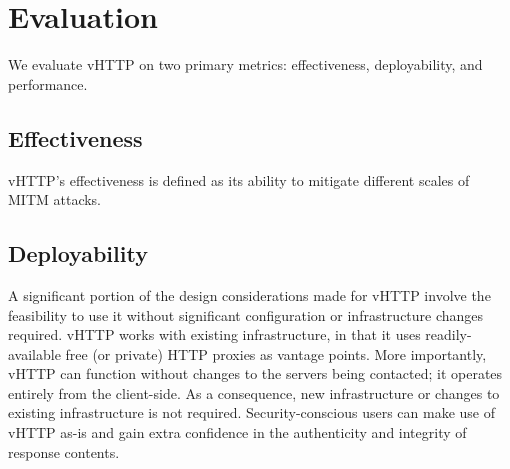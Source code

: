 \section{Evaluation}
\label{sec:eval}

We evaluate vHTTP on two primary metrics: effectiveness, deployability, and
performance.

\subsection{Effectiveness}

vHTTP's effectiveness is defined as its ability to mitigate different scales of
MITM attacks.

\subsection{Deployability}

A significant portion of the design considerations made for vHTTP involve the
feasibility to use it without significant configuration or infrastructure
changes required. vHTTP works with existing infrastructure, in that it uses
readily-available free (or private) HTTP proxies as vantage points. More
importantly, vHTTP can function without changes to the servers being contacted;
it operates entirely from the client-side. As a consequence, new infrastructure
or changes to existing infrastructure is not required. Security-conscious users
can make use of vHTTP as-is and gain extra confidence in the authenticity and
integrity of response contents.
